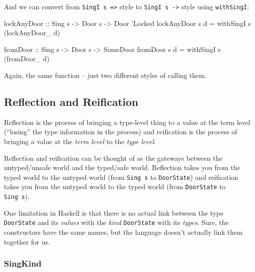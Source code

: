 \documentclass[]{article}
\newenvironment{Shaded}{}{}
\newcommand{\CharTok}[1]{\textcolor[rgb]{0.25,0.44,0.63}{#1}}
\newcommand{\DataTypeTok}[1]{\textcolor[rgb]{0.56,0.13,0.00}{#1}}
\newcommand{\FunctionTok}[1]{\textcolor[rgb]{0.02,0.16,0.49}{#1}}
\newcommand{\NormalTok}[1]{#1}
\newcommand{\OtherTok}[1]{\textcolor[rgb]{0.00,0.44,0.13}{#1}}
\begin{document}
And we can convert from \texttt{SingI\ s\ =\textgreater{}} style to
\texttt{SingI\ s\ -\textgreater{}} style using \texttt{withSingI}:

\begin{Shaded}
\begin{Highlighting}[]
\OtherTok{lockAnyDoor ::} \DataTypeTok{Sing}\NormalTok{ s }\OtherTok{->} \DataTypeTok{Door}\NormalTok{ s }\OtherTok{->} \DataTypeTok{Door} \CharTok{'Locked}
\NormalTok{lockAnyDoor s d }\FunctionTok{=}\NormalTok{ withSingI s (lockAnyDoor_ d)}

\OtherTok{fromDoor ::} \DataTypeTok{Sing}\NormalTok{ s }\OtherTok{->} \DataTypeTok{Door}\NormalTok{ s }\OtherTok{->} \DataTypeTok{SomeDoor}
\NormalTok{fromDoor s d }\FunctionTok{=}\NormalTok{ withSingI s (fromDoor_ d)}
\end{Highlighting}
\end{Shaded}

Again, the same function -- just two different styles of calling them.

\hypertarget{reflection-and-reification}{%
\subsection{Reflection and Reification}\label{reflection-and-reification}}

Reflection is the process of bringing a type-level thing to a value at the term
level (``losing'' the type information in the process) and reification is the
process of bringing a value at the \emph{term level} to the \emph{type level}.

Reflection and reification can be thought of as the gateways between the
untyped/unsafe world and the typed/safe world. Reflection takes you from the
typed world to the untyped world (from \texttt{Sing\ s} to \texttt{DoorState})
and reification takes you from the untyped world to the typed world (from
\texttt{DoorState} to \texttt{Sing\ s}).

One limitation in Haskell is that there is no actual link between the type
\texttt{DoorState} and its \emph{values} with the \emph{kind} \texttt{DoorState}
with its \emph{types}. Sure, the constructors have the same names, but the
language doesn't actually link them together for us.

\hypertarget{singkind}{%
\subsubsection{SingKind}\label{singkind}}
\end{document}
